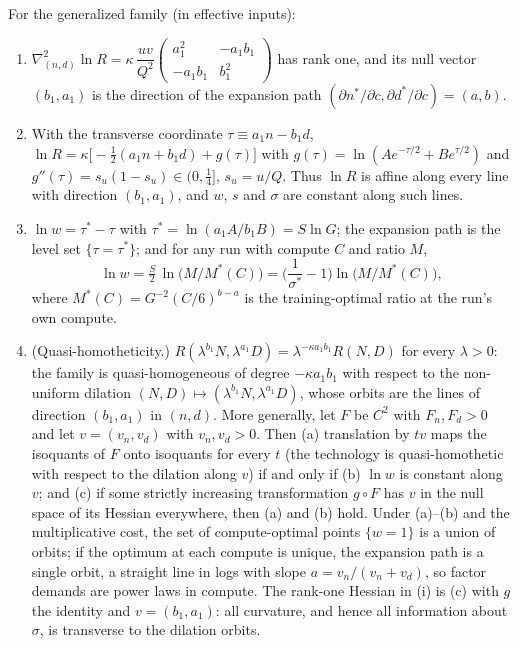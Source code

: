 \begin{lemma}\label{lem:geometry}
For the generalized family (in effective inputs):
\begin{enumerate}
\item[(i)] $\nabla^2_{(n,d)}\ln R=\kappa\,\dfrac{uv}{Q^2}\begin{pmatrix}a_1^2&-a_1b_1\\-a_1b_1&b_1^2\end{pmatrix}$ has rank
one, and its null vector $(b_1,a_1)$ is the direction of the expansion path $(\partial n^*/\partial c,\partial d^*/\partial c)=(a,b)$.
\item[(ii)] With the transverse coordinate $\tau\equiv a_1n-b_1d$,
$\ln R=\kappa\big[-\tfrac12(a_1n+b_1d)+g(\tau)\big]$ with $g(\tau)=\ln(Ae^{-\tau/2}+Be^{\tau/2})$ and
$g''(\tau)=s_u(1-s_u)\in(0,\tfrac14]$, $s_u=u/Q$. Thus $\ln R$ is affine along every line with direction $(b_1,a_1)$,
and $w$, $s$ and $\sigma$ are constant along such lines.
\item[(iii)] $\ln w=\tau^*-\tau$ with $\tau^*=\ln(a_1A/b_1B)=S\ln G$; the expansion path is the level set
$\{\tau=\tau^*\}$; and for any run with compute $C$ and ratio $M$,
\begin{equation}\label{eq:A-wM}
\ln w=\tfrac{S}{2}\,\ln\!\big(M/M^*(C)\big)=\Big(\frac1{\sigma^*}-1\Big)\ln\!\big(M/M^*(C)\big),
\end{equation}
where $M^*(C)=G^{-2}(C/6)^{b-a}$ is the training-optimal ratio at the run's own compute.
\item[(iv)] (Quasi-homotheticity.) $R(\lambda^{b_1}N,\lambda^{a_1}D)=\lambda^{-\kappa a_1b_1}R(N,D)$ for every $\lambda>0$:
the family is quasi-homogeneous of degree $-\kappa a_1b_1$ with respect to the non-uniform dilation
$(N,D)\mapsto(\lambda^{b_1}N,\lambda^{a_1}D)$, whose orbits are the lines of direction $(b_1,a_1)$ in $(n,d)$. More
generally, let $F$ be $C^2$ with $F_n,F_d>0$ and let $v=(v_n,v_d)$ with $v_n,v_d>0$. Then (a) translation by $tv$ maps the
isoquants of $F$ onto isoquants for every $t$ (the technology is quasi-homothetic with respect to the dilation along $v$)
if and only if (b) $\ln w$ is constant along $v$; and (c) if some strictly increasing transformation $g\circ F$ has $v$ in
the null space of its Hessian everywhere, then (a) and (b) hold. Under (a)--(b) and the multiplicative cost, the set of
compute-optimal points $\{w=1\}$ is a union of orbits; if the optimum at each compute is unique, the expansion path is a
single orbit, a straight line in logs with slope $a=v_n/(v_n+v_d)$, so factor demands are power laws in compute. The
rank-one Hessian in (i) is (c) with $g$ the identity and $v=(b_1,a_1)$: all curvature, and hence all information about
$\sigma$, is transverse to the dilation orbits.
\end{enumerate}
\end{lemma}

